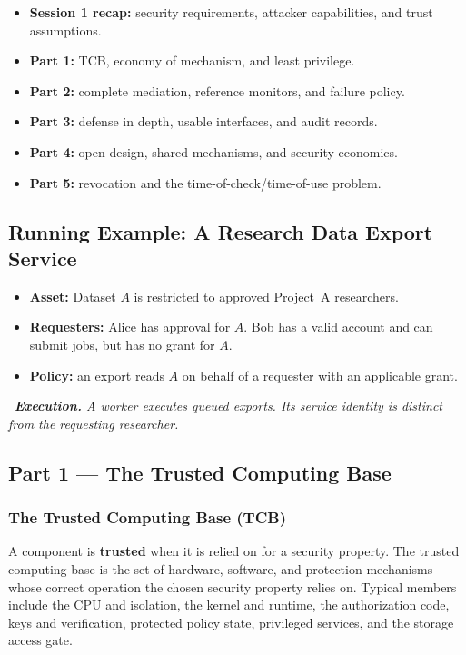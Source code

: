 \documentclass[hidelinks]{article}
\newcommand{\callout}[1]{\par\smallskip\noindent{\color{capri}$\blacktriangleright$}\ \textit{#1}\par\smallskip}
\begin{document}
\begin{itemize}
    \item \textbf{Session 1 recap:} security requirements, attacker capabilities, and trust assumptions.
    \item \textbf{Part 1:} TCB, economy of mechanism, and least privilege.
    \item \textbf{Part 2:} complete mediation, reference monitors, and failure policy.
    \item \textbf{Part 3:} defense in depth, usable interfaces, and audit records.
    \item \textbf{Part 4:} open design, shared mechanisms, and security economics.
    \item \textbf{Part 5:} revocation and the time-of-check/time-of-use problem.
\end{itemize}

\subsection{Running Example: A Research Data Export Service}

\begin{itemize}
    \item \textbf{Asset:} Dataset $A$ is restricted to approved Project~A researchers.
    \item \textbf{Requesters:} Alice has approval for $A$. Bob has a valid account and can submit jobs, but has no grant for $A$.
    \item \textbf{Policy:} an export reads $A$ on behalf of a requester with an applicable grant.
\end{itemize}

\callout{\textbf{Execution.} A worker executes queued exports. Its service identity is distinct from the requesting researcher.}

\subsection{Part 1 --- The Trusted Computing Base}

\subsubsection{The Trusted Computing Base (TCB)}

A component is \textbf{trusted} when it is relied on for a security property. The trusted computing base is the set of hardware, software, and protection mechanisms whose correct operation the chosen security property relies on. Typical members include the CPU and isolation, the kernel and runtime, the authorization code, keys and verification, protected policy state, privileged services, and the storage access gate.
\end{document}
